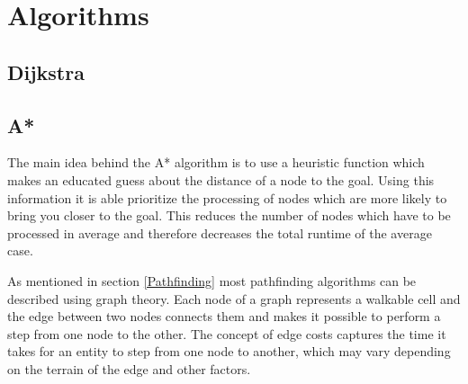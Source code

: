 \documentclass[12pt, a4paper]{article}
\begin{document}


\section{Algorithms}


\subsection{Dijkstra}







\subsection{A*}


The main idea behind the A* algorithm is to use a heuristic function which makes
an educated guess about the distance of a node to the goal. Using this
information it is able prioritize the processing of nodes which are more likely
to bring you closer to the goal. This reduces the number of nodes which have to
be processed in average and therefore decreases the total runtime of the average
case.


As mentioned in section \ref{Pathfinding} most pathfinding algorithms can be
described using graph theory. Each node of a graph represents a walkable cell
and the edge between two nodes connects them and makes it possible to perform a
step from one node to the other. The concept of edge costs captures the time it
takes for an entity to step from one node to another, which may vary depending
on the terrain of the edge and other factors.
\end{document}
